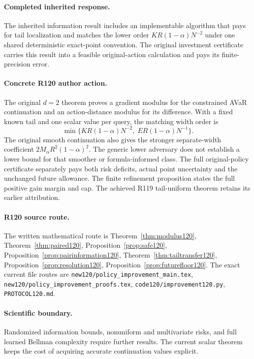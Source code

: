 \paragraph{Completed inherited response.}
The inherited information result includes an implementable algorithm that pays for tail localization and matches the lower order $KR(1-\alpha)N^{-2}$ under one shared deterministic exact-point convention. The original investment certificate carries this result into a feasible original-action calculation and pays its finite-precision error.
\paragraph{Concrete R120 author action.}
The original $d=2$ theorem proves a gradient modulus for the constrained
AVaR continuation and an action-distance modulus for its difference. With
a fixed known tail and one scalar value per query, the matching width order is
\[
\min\{KR(1-\alpha)N^{-2},\;ER(1-\alpha)N^{-1}\}.
\]
The original smooth continuation also gives the stronger separate-width
coefficient $2M_\alpha R^2(1-\alpha)^2$. The generic lower adversary does
not establish a lower bound for that smoother or formula-informed class.
The full original-policy certificate separately pays both risk deficits,
actual point uncertainty and the unchanged future allowance. The finite
refinement proposition states the full positive gain margin and cap.
The achieved R119 tail-uniform theorem retains its earlier attribution.
\paragraph{R120 source route.}
The written mathematical route is Theorem~\ref{thm:modulus120}, Theorem~\ref{thm:paired120}, Proposition~\ref{prop:safe120}, Proposition~\ref{prop:pairinformation120}, Theorem~\ref{thm:tailtransfer120}, Proposition~\ref{prop:resolution120}, Proposition~\ref{prop:futurefloor120}. The exact current file routes are \nolinkurl{new120/policy_improvement_main.tex}, \nolinkurl{new120/policy_improvement_proofs.tex}, \nolinkurl{code120/improvement120.py}, \nolinkurl{PROTOCOL120.md}.
\paragraph{Scientific boundary.}
Randomized information bounds, nonuniform and multivariate risks, and full learned Bellman complexity require further results. The current scalar theorem keeps the cost of acquiring accurate continuation values explicit.


